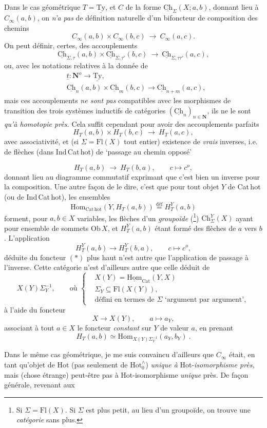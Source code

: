 \documentclass[11pt]{article}
\newcommand{\printedpage}[1]{\marginpar{\footnotesize p.~#1}}
\newcommand{\msp}[1]{\marginpar{\footnotesize [#1]}}
\newcommand{\Ch}{\underline{\mathrm{Ch}}}
\newcommand{\Ty}{\underline{\mathrm{Ty}}}
\newcommand{\Hotz}{\mathrm{Hot}^{\wedge}_{0}}
\begin{document}
\msp{page 115}
Dans le cas géométrique $T = \Ty$, et $C$ de la forme $\Ch_{\Sigma}(X;a,b)$, donnant lieu à $C_{\infty}(a,b)$, on \textit{n'a pas} de définition naturelle d'un bifoncteur de composition des chemins
\[
C_{\infty}(a,b) \times C_{\infty}(b,c) \ \longrightarrow\ C_{\infty}(a,c).
\]
On peut définir, certes, des accouplements
\[
\Ch_{\Sigma,\tau}(a,b) \times \Ch_{\Sigma,\tau'}(b,c) \ \longrightarrow\ \Ch_{\Sigma,\tau\tau'}(a,c),
\]
ou, avec les notations relatives à la donnée de
\[
\begin{aligned}
&\underline{t} : \mathbf{N}^{o} \longrightarrow \Ty,\\
&\Ch_{n}(a,b) \times \Ch_{m}(b,c) \longrightarrow \Ch_{n+m}(a,c),
\end{aligned}
\]
\printedpage{73}
mais ces accouplements \textit{ne sont pas} compatibles avec les morphismes de transition des trois systèmes inductifs de catégories $(\Ch_{n})_{n\in\mathbf{N}}$, ils ne le sont \textit{qu'à homotopie près.} Cela suffit cependant pour avoir des accouplements parfaits
\[
H_{T}(a,b) \times H_{T}(b,c) \ \longrightarrow\ H_{T}(a,c),
\]
avec associativité, et (si $\Sigma = \mathrm{Fl}(X)$ tout entier) existence de \textit{vrais} inverses, i.e. de flèches (dans Ind\,Cat\,hot) de `passage au chemin opposé'

\msp{page 116}
\[
H_{T}(a,b) \ \longrightarrow\ H_{T}(b,a), \qquad c \longmapsto c^{o}, \tag*{$(*)$}
\]
donnant lieu au diagramme commutatif exprimant que c'est bien un inverse pour la composition. Une autre façon de le dire, c'est que pour tout objet $Y$ de Cat\,hot (ou de Ind\,Cat\,hot), les ensembles
\[
\mathrm{Hom}_{\mathrm{Cat\,hot}}(Y, H_{T}(a,b)) \overset{\text{déf}}{=} H_{T}^{Y}(a,b)
\]
forment, pour $a,b \in X$ variables, les flèches d'un \textit{groupoïde} (\footnote[25]{Si $\Sigma = \mathrm{Fl}(X)$. Si $\Sigma$ est plus petit, au lieu d'un groupoïde, on trouve une \textit{catégorie} sans plus.}) $\mathrm{Ch}_{\Sigma}^{Y}(X)$ ayant pour ensemble de sommets $\mathrm{Ob}\,X$, et $H_{T}^{Y}(a,b)$ étant formé des flèches de $a$ vers $b$. L'application
\[
H_{T}^{Y}(a,b) \longrightarrow H_{T}^{Y}(b,a), \qquad c \longmapsto c^{o},
\]
déduite du foncteur $(*)$ plus haut n'est autre que l'application de passage à l'inverse. Cette catégorie n'est d'ailleurs autre que celle déduit de %
\[
X(Y)\Sigma_{Y}^{-1}, \qquad \text{où } \left\{
\begin{aligned}
&X(Y) = \underline{\mathrm{Hom}}_{\mathrm{Cat}}(Y,X)\\
&\Sigma_{Y} \subseteq \mathrm{Fl}(X(Y)),\\
&\text{défini en termes de } \Sigma \text{ `argument par argument'},
\end{aligned}
\right.
\]
à l'aide du foncteur
\[
X \longrightarrow X(Y), \qquad a \longmapsto a_{Y},
\]
\msp{page 117}
associant à tout $a \in X$ le foncteur \textit{constant} sur $Y$ de valeur $a$, en prenant
\[
H_{T}(a,b) \simeq \mathrm{Hom}_{X(Y)\Sigma_{Y}^{-1}}(a_{Y}, b_{Y}) \ .
\]

Dans le même cas géométrique, je me suis convaincu d'ailleurs que $C_{\infty}$ était, en tant qu'objet de Hot (pas seulement de $\Hotz$) \textit{unique à} Hot-\textit{isomorphisme près,} mais (chose étrange) peut-être pas à Hot-isomorphisme \textit{unique} près. De façon générale, revenant aux
\end{document}
